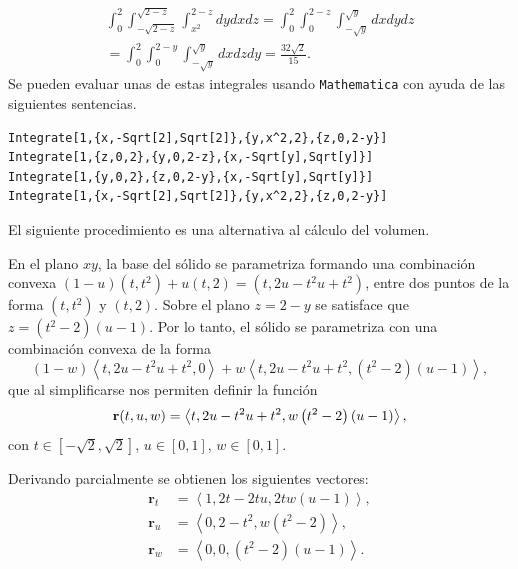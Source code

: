 \begin{multline*} \int_{0}^2\int_{-\sqrt{2-z}}^{\sqrt{2-z}}\int_{x^2}^{2-z}dydxdz =
\int_{0}^2\int_{0}^{2-z}\int_{-\sqrt{y}}^{\sqrt{y}}dxdydz \\
= \int_{0}^2\int_{0}^{2-y}\int_{-\sqrt{y}}^{\sqrt{y}}dxdzdy = \frac{32\sqrt{2}}{15}.
\end{multline*}
Se pueden evaluar unas de estas integrales usando \verb"Mathematica" con ayuda de las siguientes sentencias.

\begin{tcolorbox}[title=\bf Instrucción en \verb"Mathematica"]\begin{Verbatim}[formatcom=\letraverbatim]
Integrate[1,{x,-Sqrt[2],Sqrt[2]},{y,x^2,2},{z,0,2-y}]
Integrate[1,{z,0,2},{y,0,2-z},{x,-Sqrt[y],Sqrt[y]}]
Integrate[1,{y,0,2},{z,0,2-y},{x,-Sqrt[y],Sqrt[y]}]
Integrate[1,{x,-Sqrt[2],Sqrt[2]},{y,x^2,2},{z,0,2-y}]
\end{Verbatim}
\end{tcolorbox}

El siguiente procedimiento es una alternativa al cálculo del volumen.

En el plano $xy$, la base del sólido se parametriza formando una combinación convexa
$\left( 1-u\right) \left( t,t^2\right) +u\left(t,2\right) = \left( t,2u-t^2u+t^2\right)$,
entre dos puntos de la forma $\left( t,t^2\right) $ y $\left( t,2\right)$.
Sobre el plano $z=2-y$ se satisface que $z=(t^2-2)(u-1) $. Por lo tanto, el sólido se parametriza con una combinación convexa de la forma
\[\left( 1-w\right) \left\langle t,2u-t^2u+t^2,0\right\rangle +w\left\langle t,2u-t^2u+t^2,\left(t^2-2\right) \left( u-1\right) \right\rangle,\]
que al simplificarse nos permiten definir la función
\[{\bf r}(t,u,w)=\left\langle t,2u-t^2u+t^2,w\left( t^2-2\right) \left( u-1\right) \right\rangle,\]
con $t\in [-\sqrt{2},\sqrt{2}]$, $u\in [0,1]$, $w\in [0,1]$.

Derivando parcialmente se obtienen los siguientes vectores:
\begin{align*}
\mathbf{r}_{t} &= \left\langle 1,2t-2tu,2tw\left( u-1\right) \right\rangle, \\
\mathbf{r}_{u} &= \left\langle 0,2-t^2,w\left( t^2-2\right)\right\rangle, \\
\mathbf{r}_{w} &=\left\langle 0,0,\left( t^2-2\right) \left( u-1\right)\right\rangle.
\end{align*}

